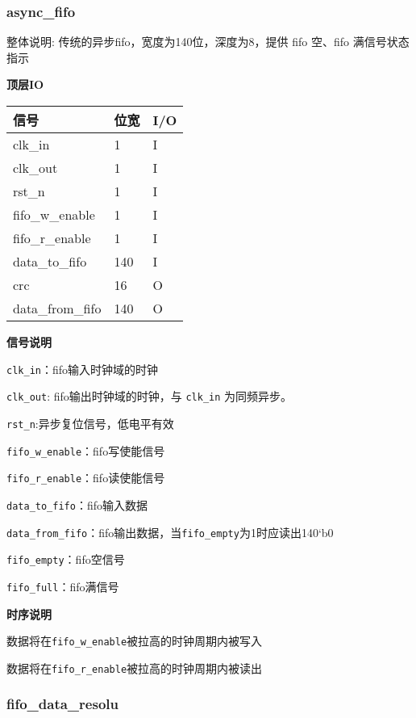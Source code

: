 \documentclass[12pt,]{article}
\begin{document}
\hypertarget{async_fifo}{%
\subsubsection{async\_fifo}\label{async_fifo}}

整体说明: 传统的异步fifo，宽度为140位，深度为8，提供 fifo 空、fifo
满信号状态指示

\textbf{顶层IO}

\begin{longtable}[]{@{}lll@{}}
\toprule\noalign{}
信号 & 位宽 & I/O \\
\midrule\noalign{}
\endhead
\bottomrule\noalign{}
\endlastfoot
clk\_in & 1 & I \\
clk\_out & 1 & I \\
rst\_n & 1 & I \\
fifo\_w\_enable & 1 & I \\
fifo\_r\_enable & 1 & I \\
data\_to\_fifo & 140 & I \\
crc & 16 & O \\
data\_from\_fifo & 140 & O \\
\end{longtable}

\textbf{信号说明}

\texttt{clk\_in}：fifo输入时钟域的时钟

\texttt{clk\_out}: fifo输出时钟域的时钟，与 \texttt{clk\_in}
为同频异步。

\texttt{rst\_n}:异步复位信号，低电平有效

\texttt{fifo\_w\_enable}：fifo写使能信号

\texttt{fifo\_r\_enable}：fifo读使能信号

\texttt{data\_to\_fifo}：fifo输入数据

\texttt{data\_from\_fifo}：fifo输出数据，当\texttt{fifo\_empty}为1时应读出140`b0

\texttt{fifo\_empty}：fifo空信号

\texttt{fifo\_full}：fifo满信号

\textbf{时序说明}

数据将在\texttt{fifo\_w\_enable}被拉高的时钟周期内被写入

数据将在\texttt{fifo\_r\_enable}被拉高的时钟周期内被读出

\hypertarget{fifo_data_resolu}{%
\subsubsection{fifo\_data\_resolu}\label{fifo_data_resolu}}
\end{document}
